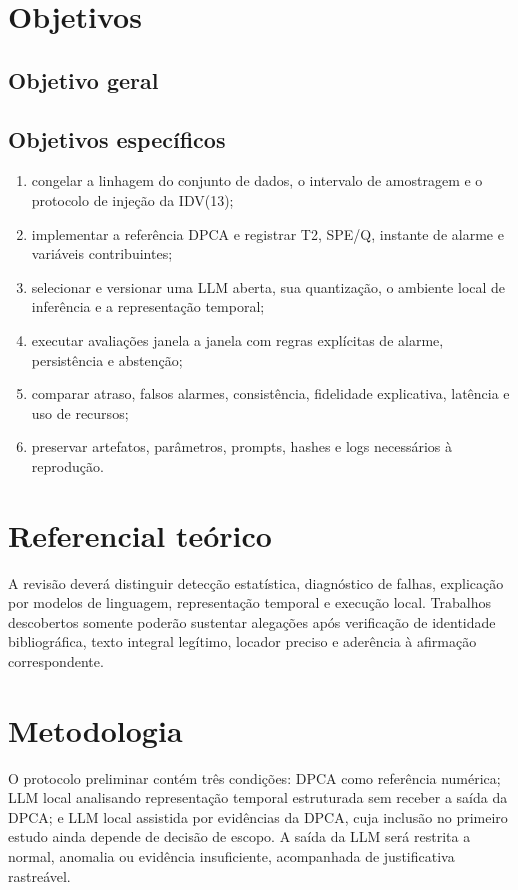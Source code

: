 \documentclass[a4paper,12pt]{abntex2}
\begin{document}
\section{Objetivos}
\subsection{Objetivo geral}
\ResearchObjectivePT

\subsection{Objetivos específicos}
\begin{enumerate}
  \item congelar a linhagem do conjunto de dados, o intervalo de amostragem e o protocolo de injeção da IDV(13);
  \item implementar a referência DPCA e registrar T2, SPE/Q, instante de alarme e variáveis contribuintes;
  \item selecionar e versionar uma LLM aberta, sua quantização, o ambiente local de inferência e a representação temporal;
  \item executar avaliações janela a janela com regras explícitas de alarme, persistência e abstenção;
  \item comparar atraso, falsos alarmes, consistência, fidelidade explicativa, latência e uso de recursos;
  \item preservar artefatos, parâmetros, prompts, hashes e logs necessários à reprodução.
\end{enumerate}

\section{Referencial teórico}
\LiteratureStatusPT

A revisão deverá distinguir detecção estatística, diagnóstico de falhas, explicação por modelos de linguagem, representação temporal e execução local. Trabalhos descobertos somente poderão sustentar alegações após verificação de identidade bibliográfica, texto integral legítimo, locador preciso e aderência à afirmação correspondente.

\section{Metodologia}
\ResearchMethodPT

O protocolo preliminar contém três condições: DPCA como referência numérica; LLM local analisando representação temporal estruturada sem receber a saída da DPCA; e LLM local assistida por evidências da DPCA, cuja inclusão no primeiro estudo ainda depende de decisão de escopo. A saída da LLM será restrita a normal, anomalia ou evidência insuficiente, acompanhada de justificativa rastreável.
\end{document}
